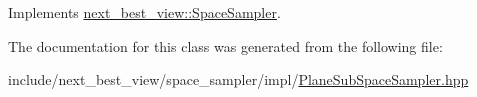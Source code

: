 \-Implements \hyperlink{classnext__best__view_1_1SpaceSampler_a0213aa3d023846cb9daee94cc9e1e109}{next\-\_\-best\-\_\-view\-::\-Space\-Sampler}.



\-The documentation for this class was generated from the following file\-:\begin{DoxyCompactItemize}
\item 
include/next\-\_\-best\-\_\-view/space\-\_\-sampler/impl/\hyperlink{PlaneSubSpaceSampler_8hpp}{\-Plane\-Sub\-Space\-Sampler.\-hpp}\end{DoxyCompactItemize}
